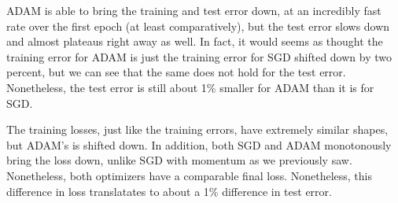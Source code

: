 \documentclass[10pt]{article}
\begin{document}
\begin{multicols}{2}
ADAM is able to bring the training and test error down, at an incredibly fast rate over the first epoch (at least comparatively), but the test error slows down and almost plateaus right away as well. In fact, it would seems as thought the training error for ADAM is just the training error for SGD shifted down by two percent, but we can see that the same does not hold for the test error. Nonetheless, the test error is still about 1\% smaller for ADAM than it is for SGD. \par
The training losses, just like the training errors, have extremely similar shapes, but ADAM's is shifted down. In addition, both SGD and ADAM monotonously bring the loss down, unlike SGD with momentum as we previously saw. Nonetheless, both optimizers have a comparable final loss. Nonetheless, this difference in loss translatates to about a 1\% difference in test error. \par 


\end{multicols}
\end{document}
